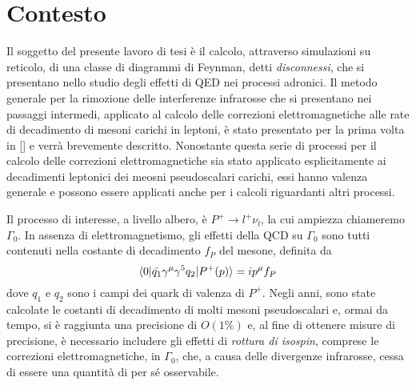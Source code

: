 \documentclass[LaM]{sapthesis}
\begin{document}
	\chapter{Contesto}
	Il soggetto del presente lavoro di tesi è il calcolo, attraverso simulazioni su reticolo, di una classe di diagrammi di Feynman, detti \emph{disconnessi}, che si presentano nello studio degli effetti di QED nei processi adronici. Il metodo generale per la rimozione delle interferenze infrarosse che si presentano nei passaggi intermedi, applicato al calcolo delle correzioni elettromagnetiche alle rate di decadimento di mesoni carichi in leptoni, è stato presentato per la prima volta in [\color{green}{articolo QED Corrections to Hadronic Processes in Lattice QCD}\color{black}] e verrà brevemente descritto. Nonostante questa serie di processi per il calcolo delle correzioni elettromagnetiche sia stato applicato esplicitamente ai decadimenti leptonici dei meosni pseudoscalari carichi, essi hanno valenza generale e possono essere applicati anche per i calcoli riguardanti altri processi.
	
	Il processo di interesse, a livello albero, è $P^+\to l^+\nu_l$, la cui ampiezza chiameremo $\Gamma_0$. In assenza di elettromagnetismo, gli effetti della QCD su $\Gamma_0$ sono tutti contenuti nella costante di decadimento $f_P$ del mesone, definita da
	\begin{equation}
	\braket{0|\bar{q_1}\gamma^\mu\gamma^5q_2|P^+(p)}=ip^\mu f_P
	\end{equation}
	dove $q_1$ e $q_2$ sono i campi dei quark di valenza di $P^+$. Negli anni, sono state calcolate le costanti di decadimento di molti mesoni pseudoscalari e, ormai da tempo, 
	si è raggiunta una precisione di $O(1\%)$ e, al fine di ottenere misure di precisione, è necessario includere gli effetti di \emph{rottura di isospin}, comprese le correzioni elettromagnetiche, in $\Gamma_0$, che, a causa delle divergenze infrarosse, cessa di essere una quantità di per sé osservabile.
	
\end{document}
